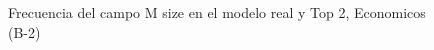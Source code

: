 \begin{figure}[H]
    \centering
    
    \caption{Frecuencia del campo M size en el modelo real y Top 2, Economicos (B-2)}
    \label{frecuency-M Size-top2}
\end{figure}